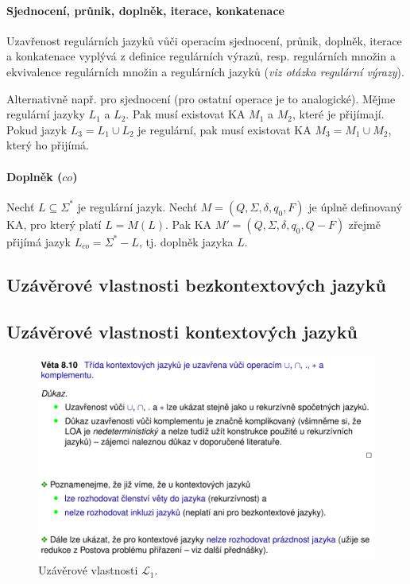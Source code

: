 \paragraph*{Sjednocení, průnik, doplněk, iterace, konkatenace} \begin{compactitem}
    \item Uzavřenost regulárních jazyků vůči operacím sjednocení, průnik, doplněk, iterace a konkatenace vyplývá z definice regulárních výrazů, resp. regulárních množin a ekvivalence regulárních množin a regulárních jazyků (\textit{viz otázka regulární výrazy}). \begin{compactitem}
        \item Alternativně např. pro sjednocení (pro ostatní operace je to analogické). Mějme regulární jazyky $L_1$ a $L_2$. Pak musí existovat KA $M_1$ a $M_2$, které je přijímají. Pokud jazyk $L_3 = L_1 \cup L_2$ je regulární, pak musí existovat KA $M_3 = M_1 \cup M_2$, který ho přijímá. %
    \end{compactitem}
\end{compactitem}

\paragraph*{Doplněk ($co$)} Nechť $L \subseteq \Sigma^*$ je regulární jazyk. Nechť $M = (Q, \Sigma, \delta, q_0, F)$ je úplně definovaný KA, pro který platí $L = M(L)$. Pak KA $M' = (Q, \Sigma, \delta, q_0, Q - F)$ zřejmě přijímá jazyk $L_{co} = \Sigma^* - L$, tj. doplněk jazyka $L$.

\subsection{Uzávěrové vlastnosti bezkontextových jazyků}


\subsection{Uzávěrové vlastnosti kontextových jazyků}

\begin{figure}[H]
    \centering
    \includegraphics[width=1\linewidth]{uzaverove_vlastnosti_L1.pdf}
    \caption{Uzávěrové vlastnosti $\mathcal{L}_1$.}
\end{figure}

